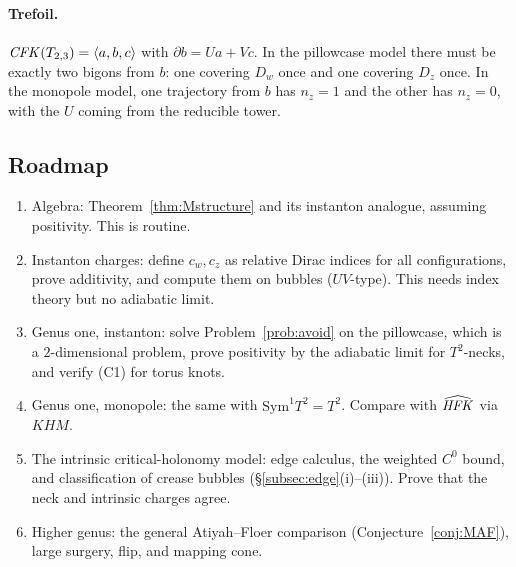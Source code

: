 \paragraph{Trefoil.}  $\mathit{CFK}(T_{2,3})=\langle a,b,c\rangle$ with $\partial b=Ua+Vc$.  In the pillowcase model there must be exactly two bigons
from $b$: one covering $D_w$ once and one covering $D_z$ once.  In the monopole model, one trajectory from $b$ has $n_z=1$ and
the other has $n_z=0$, with the $U$ coming from the reducible tower.

\subsection{Roadmap}
\begin{enumerate}[leftmargin=2em]
\item Algebra: Theorem~\ref{thm:Mstructure} and its instanton analogue, assuming positivity.  This is routine.
\item Instanton charges: define $c_w,c_z$ as relative Dirac indices for all configurations, prove additivity, and
compute them on bubbles ($UV$-type).  This needs index theory but no adiabatic limit.
\item Genus one, instanton: solve Problem~\ref{prob:avoid} on the pillowcase, which is a $2$-dimensional problem, prove
positivity by the adiabatic limit for $T^2$-necks, and verify (C1) for torus knots.
\item Genus one, monopole: the same with $\mathrm{Sym}^1T^2=T^2$.  Compare with $\widehat{\mathit{HFK}}$ via $KHM$.
\item The intrinsic critical-holonomy model: edge calculus, the weighted $C^0$ bound, and classification of crease
bubbles (\S\ref{subsec:edge}(i)--(iii)).  Prove that the neck and intrinsic charges agree.
\item Higher genus: the general Atiyah--Floer comparison (Conjecture~\ref{conj:MAF}), large surgery, flip, and
mapping cone.
\end{enumerate}

